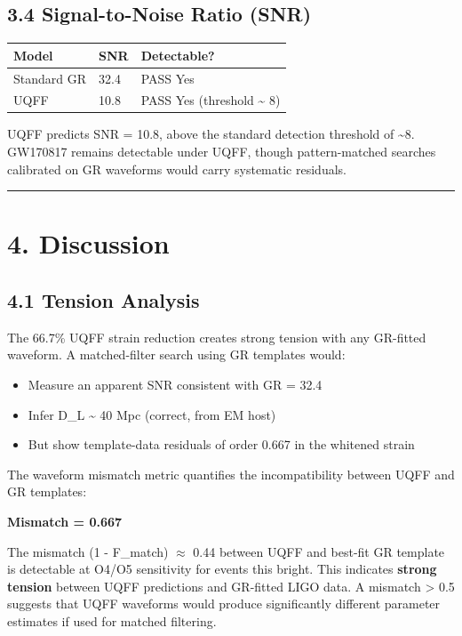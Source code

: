 \documentclass[11pt]{article}
\begin{document}
\subsection*{3.4 Signal-to-Noise Ratio (SNR)}

\begin{center}
\begin{longtable}{lll}
\toprule
Model & SNR & Detectable? \tabularnewline
\midrule
\endhead
Standard GR & 32.4 & PASS Yes \tabularnewline
UQFF & 10.8 & PASS Yes (threshold \textasciitilde{} 8) \tabularnewline
\bottomrule
\end{longtable}
\end{center}

UQFF predicts SNR = 10.8, above the standard detection threshold of \textasciitilde{}8. GW170817 remains detectable under UQFF, though pattern-matched searches calibrated on GR waveforms would carry systematic residuals.

\noindent\rule{\textwidth}{0.4pt}

\section*{4. Discussion}

\subsection*{4.1 Tension Analysis}

The 66.7\% UQFF strain reduction creates strong tension with any GR-fitted waveform. A matched-filter search using GR templates would:

\begin{itemize}
  \item Measure an apparent SNR consistent with GR = 32.4
  \item Infer D\_L \textasciitilde{} 40 Mpc (correct, from EM host)
  \item But show template-data residuals of order 0.667 in the whitened strain
\end{itemize}

The waveform mismatch metric quantifies the incompatibility between UQFF and GR templates:

\textbf{Mismatch = 0.667}

The mismatch (1 - F\_match) $\approx$ 0.44 between UQFF and best-fit GR template is detectable at O4/O5 sensitivity for events this bright. This indicates \textbf{strong tension} between UQFF predictions and GR-fitted LIGO data. A mismatch > 0.5 suggests that UQFF waveforms would produce significantly different parameter estimates if used for matched filtering.
\end{document}

